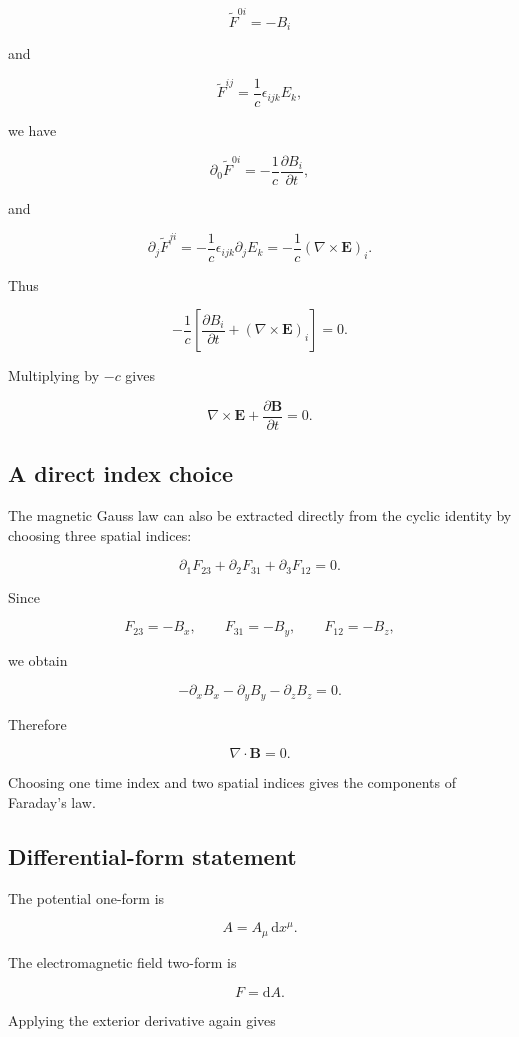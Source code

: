 \[
\widetilde{F}^{0i}=-B_i
\]

and

\[
\widetilde{F}^{ij}
=
\frac{1}{c}
\epsilon_{ijk}E_k,
\]

we have

\[
\partial_0
\widetilde{F}^{0i}
=
-
\frac{1}{c}
\frac{\partial B_i}{\partial t},
\]

and

\[
\partial_j
\widetilde{F}^{ji}
=
-
\frac{1}{c}
\epsilon_{ijk}
\partial_jE_k
=
-
\frac{1}{c}
(\nabla\times\mathbf{E})_i.
\]

Thus

\[
-
\frac{1}{c}
\left[
\frac{\partial B_i}{\partial t}
+
(\nabla\times\mathbf{E})_i
\right]
=0.
\]

Multiplying by \(-c\) gives

\[
\boxed{
\nabla\times\mathbf{E}
+
\frac{\partial\mathbf{B}}{\partial t}
=0
}.
\]

\subsection{A direct index choice}

The magnetic Gauss law can also be extracted directly from the cyclic identity by choosing three spatial indices:

\[
\partial_1F_{23}
+
\partial_2F_{31}
+
\partial_3F_{12}
=0.
\]

Since

\[
F_{23}=-B_x,
\qquad
F_{31}=-B_y,
\qquad
F_{12}=-B_z,
\]

we obtain

\[
-
\partial_xB_x
-
\partial_yB_y
-
\partial_zB_z
=0.
\]

Therefore

\[
\nabla\cdot\mathbf{B}=0.
\]

Choosing one time index and two spatial indices gives the components of Faraday's law.

\subsection{Differential-form statement}

The potential one-form is

\[
A
=
A_{\mu}\,\mathrm{d}x^{\mu}.
\]

The electromagnetic field two-form is

\[
F
=
\mathrm{d}A.
\]

Applying the exterior derivative again gives

